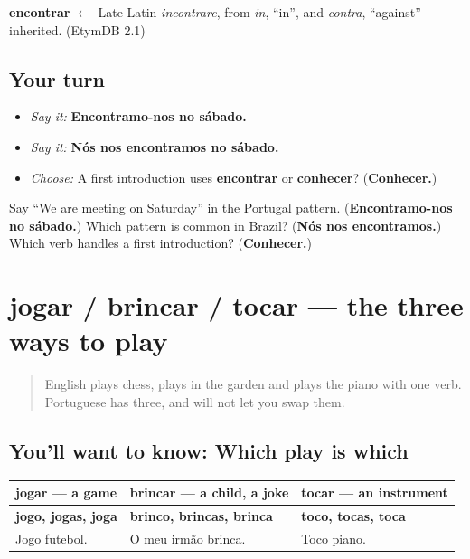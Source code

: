 \begin{cousinweb}
\textbf{encontrar} $\leftarrow$ Late Latin \emph{incontrare}, from \emph{in}, \textquotedblleft{}in\textquotedblright{}, and \emph{contra}, \textquotedblleft{}against\textquotedblright{} — inherited. (EtymDB 2.1)
\end{cousinweb}

\subsection*{Your turn}
\begin{itemize}
\raggedright
  \item \emph{Say it:} \textbf{Encontramo-nos no sábado.}
  \item \emph{Say it:} \textbf{Nós nos encontramos no sábado.}
  \item \emph{Choose:} A first introduction uses \textbf{encontrar} or \textbf{conhecer}? (\textbf{Conhecer.})
\end{itemize}

\begin{tcolorbox}[breakable,colback=teal!4,colframe=teal!35!black,title={Before you move on}]
Say “We are meeting on Saturday” in the Portugal pattern. (\textbf{Encontramo-nos no sábado.}) Which pattern is common in Brazil? (\textbf{Nós nos encontramos.}) Which verb handles a first introduction? (\textbf{Conhecer.})
\end{tcolorbox}
\section[jogar / brincar / tocar]{jogar / brincar / tocar — the three ways to play}

\label{lesson:PT-C22-jogar-brincar-tocar}



\begin{quote}
English plays chess, plays in the garden and plays the piano with one verb. Portuguese has three, and will not let you swap them.
\end{quote}

\subsection*{You'll want to know: Which play is which}
\noindent
\begin{tabularx}{\linewidth}{@{}>{\raggedright\arraybackslash}X>{\raggedright\arraybackslash}X>{\raggedright\arraybackslash}X@{}}
\toprule
\textbf{\textbf{jogar} — a game} & \textbf{\textbf{brincar} — a child, a joke} & \textbf{\textbf{tocar} — an instrument} \\
\midrule
\textbf{jogo, jogas, joga} & \textbf{brinco, brincas, brinca} & \textbf{toco, tocas, toca} \\
Jogo futebol. & O meu irmão brinca. & Toco piano. \\
\bottomrule
\end{tabularx}

